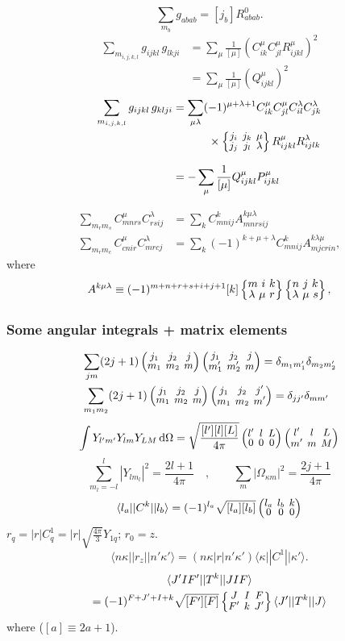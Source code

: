 \documentclass[10pt,twocolumn,a4paper]{article}%
\newcommand{\bra}[1]{\ensuremath{\langle #1|}}	%
\newcommand{\ket}[1]{\ensuremath{|#1\rangle}}	%
\newcommand{\threej}[6]{
\renewcommand\arraystretch{0.75}\setlength\arraycolsep{2pt}
\small\ensuremath{\begin{pmatrix}#1&#2&#3\\#4&#5&#6\end{pmatrix}}
}	%
\newcommand{\sixj}[6]{\renewcommand\arraystretch{0.75}\setlength\arraycolsep{2pt}\small\ensuremath{\begin{Bmatrix}#1&#2&#3\\#4&#5&#6\end{Bmatrix}}}	%
\newcommand{\sixjs}[6]{\renewcommand\arraystretch{0.75}\ensuremath{\begin{Bmatrix}#1~#2~#3\\#4~#5~#6\end{Bmatrix}}}	%
\newcommand{\be}{\begin{equation}}
\newcommand{\ee}{\end{equation}}
\def\d{\ensuremath{{\rm d}}}
\renewcommand{\k}{\ensuremath{\kappa}}
\begin{document}

\be
\sum_{m_b}g_{abab} = [j_b] R^0_{abab}.
\ee
%
\begin{align}
\sum_{m_{i,j,k,l}}  g_{ijkl} \, g_{lkji}
    &= \sum_\mu \frac{1}{[\mu]} \left( C^\mu_{ik}C^\mu_{jl} R^\mu_{ijkl}\right)^2 \\
    &= \sum_\mu \frac{1}{[\mu]} \left( Q^\mu_{ijkl}\right)^2
\end{align}
\begin{align}
\sum_{m_{i,j,k,l}}  g_{ijkl} \, g_{klji}
    &=\sum_{\mu \lambda}(-1)^{\mu+\lambda+1}C^\mu_{ik}C^\mu_{jl}C^\lambda_{il}C^\lambda_{jk} \notag \\
    &\phantom{=\sum_{\mu \lambda}}~~\times \sixj{j_i}{j_k}{\mu}{j_j}{j_l}{\lambda}R^\mu_{ijkl}R^\lambda_{ijlk} \\
    &=-\sum_\mu \frac{1}{[\mu]}  Q^\mu_{ijkl}P^\mu_{ijkl}
\end{align}

\begin{align}
\sum_{m_r m_s}C^\mu_{mnrs} C^\lambda_{rsij} &= \sum_k C^k_{mnij}A^{k\mu\lambda}_{mnrsij}\\
\sum_{m_r m_c}C^\mu_{cnir} C^\lambda_{mrcj} &= \sum_k (-1)^{k+\mu+\lambda}C^k_{mnij}A^{k\lambda\mu}_{mjcrin},
\end{align}
where
\be
A^{k\mu\lambda} \equiv (-1)^{m+n+r+s+i+j+1}[k]\sixjs{m}{i}{k}{\lambda}{\mu}{r}\sixjs{n}{j}{k}{\lambda}{\mu}{s},
\ee


\subsubsection*{Some angular integrals + matrix elements}


\begin{align}\notag
&\sum_{jm}(2j+1)\threej{j_1}{j_2}{j}{m_1}{m_2}{m}\threej{j_1}{j_2}{j}{m_1'}{m_2'}{m} = \delta_{m_1m_1'}\delta_{m_2m_2'}
\\
&\sum_{m_1m_2}(2j+1)\threej{j_1}{j_2}{j}{m_1}{m_2}{m}\threej{j_1}{j_2}{j'}{m_1}{m_2}{m'} = \delta_{jj'}\delta_{mm'}
\end{align}
%
\begin{multline}
\int Y_{l'm'}Y_{lm}Y_{LM}\,\d \Omega = \sqrt{\frac{[l'][l][L]}{4\pi}}\threej{l'}{l}{L}{0}{0}{0}\threej{l'}{l}{L}{m'}{m}{M}
\end{multline}
\be
\sum_{m_l=-l}^l |Y_{lm_l}|^2 = \frac{2l+1}{4\pi}\quad,\qquad \sum_m |\Omega_{\k m}|^2 = \frac{2j+1}{4\pi}
\ee
%
\be
\bra{l_a}|C^k|\ket{l_b} = (-1)^{l_a}\sqrt{[l_a][l_b]}\threej{l_a}{l_b}{k}{0}{0}{0}
\ee
%
$r_q = |r| C^1_q = |r|\sqrt{\frac{4\pi}{3}}Y_{1q}$; $r_0=z$.
\be
\bra{n\k}|r_z|\ket{n'\k'} = ({n\k}|r|{n'\k'})\bra{\k}|C^1|\ket{\k'}.
\ee
%
\begin{multline}
\bra{J'IF'}|T^k|\ket{JIF} \\= (-1)^{F+J'+I+k}\sqrt{[F'][F]}\sixj{J}{I}{F}{F'}{k}{J'}\bra{J'}|T^k|\ket{J}
\end{multline}
where ($[a]\equiv2a+1$).
\end{document}
